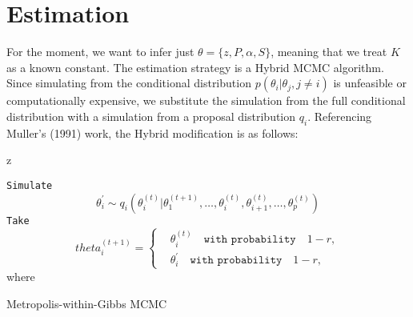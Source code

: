 \documentclass[11pt]{amsart}
\begin{document}
\newpage 

\section{Estimation}

For the moment, we want to infer just $\theta = \{ z, P, \alpha, S \}$, meaning that we treat $K$ as a known constant. The estimation strategy is a Hybrid MCMC algorithm. Since simulating from the conditional distribution $p(\theta_i| \theta_j, j\neq i)$ is unfeasible or computationally expensive, we substitute the simulation from the full conditional distribution with a simulation from a proposal distribution $q_i$. Referencing Muller's (1991) work, the Hybrid modification is as follows:


z
\begin{algorithm}
\begin{algorithmic}[h]
\State \texttt{Simulate} \begin{equation}\label{eqn_general_proposal}
\theta_i^{\prime} \sim q_i \left(\theta_i^{(t)} | \theta_1^{(t+1)}, \dots,\theta_{i}^{(t)},\theta_{i+1}^{(t)}, \dots,\theta_{p}^{(t)} \right)
\end{equation}
\State \texttt{Take} \begin{equation}
theta_i^{(t+1)} = 
\begin{cases}
&\theta_{i}^{(t)} \quad \texttt{with probability} \quad 1 - r, \\
&\theta_{i}^{\prime} \quad \texttt{with probability} \quad 1 - r,
\end{cases}
\end{equation}
\State where

\EndFor
\end{algorithmic}
\label{alg_general_algortm}
\caption{Metropolis-within-Gibbs MCMC}
\end{algorithm}
\end{document}
